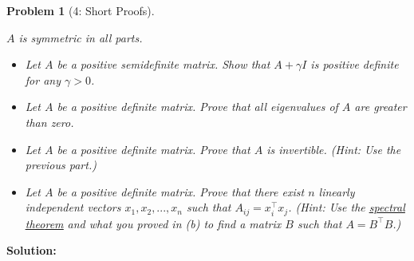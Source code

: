 \documentclass[11pt]{exam}
\theoremstyle{quest}
\newtheorem*{question}{Problem}
\begin{document}
\begin{question}[4: Short Proofs]
~

$A$ is symmetric in all parts.
\begin{itemize}
\item[(a)]
Let $A$ be a positive semidefinite matrix. Show that $A + \gamma I$ is positive
definite for any $\gamma > 0$.
\item[(b)]
Let $A$ be a positive definite matrix. Prove that all eigenvalues of $A$ are greater than zero.
\item[(c)]
Let $A$ be a positive definite matrix. Prove that $A$ is invertible. (Hint: Use the previous part.)
\item[(d)]
Let $A$ be a positive definite matrix. Prove that there exist $n$ linearly independent vectors $x_{1}, x_{2}, ..., x_{n}$
such that $A_{ij} = x_{i}^{\top}x_{j}$. (Hint: Use the
\href{https://inst.eecs.berkeley.edu/~ee127a/book/login/l_sym_sed.html}{\underline{spectral
    theorem}} and what you proved in (b) to find a matrix $B$ such that $A = B^{\top}B$.)
\end{itemize}
\end{question}
\textbf{Solution:}








\newpage

\end{document}
